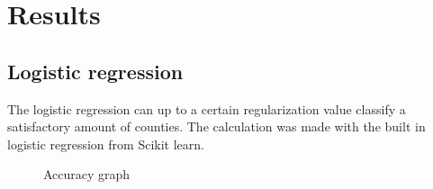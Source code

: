\section{Results}
\setlength{\parindent}{0cm}
\subsection{Logistic regression}
The logistic regression can up to a certain regularization value classify a satisfactory amount of counties. The calculation was made with the built in logistic regression from Scikit learn.  
\\
\par

\begin{figure}[H]
  \centering
    \hfill
    \hfill
   \caption{Accuracy graph}
\end{figure}
\newpage
